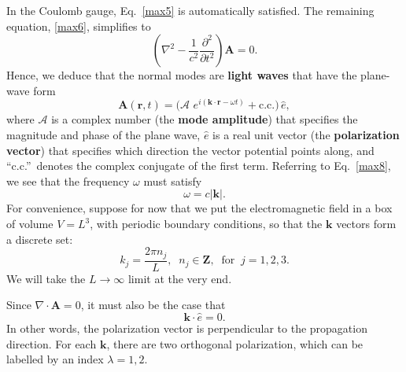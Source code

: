 \documentclass[pra,12pt]{revtex4}
\begin{document}
In the Coulomb gauge, Eq.~\eqref{max5} is automatically satisfied.
The remaining equation, \eqref{max6}, simplifies to
\begin{equation}
  \left(\nabla^2 - \frac{1}{c^2}\frac{\partial^2}{\partial t^2}\right)
  \mathbf{A} = 0. \label{max8}
\end{equation}
Hence, we deduce that the normal modes are \textbf{light waves} that
have the plane-wave form
\begin{equation}
  \mathbf{A}(\mathbf{r},t) = \Big(\mathcal{A}\,
  \, e^{i(\mathbf{k}\cdot\mathbf{r} - \omega t)} + \mathrm{c.c.}\Big)\, \hat{e},
  \label{lightplanewave}
\end{equation}
where $\mathcal{A}$ is a complex number (the \textbf{mode amplitude})
that specifies the magnitude and phase of the plane wave, $\hat{e}$ is
a real unit vector (the \textbf{polarization vector}) that specifies
which direction the vector potential points along, and
``c.c.''~denotes the complex conjugate of the first term.  Referring
to Eq.~\eqref{max8}, we see that the frequency $\omega$ must satisfy
\begin{equation}
  \omega = c|\mathbf{k}|.
\end{equation}
For convenience, suppose for now that we put the electromagnetic field
in a box of volume $V = L^3$, with periodic boundary conditions, so
that the $\mathbf{k}$ vectors form a discrete set:
\begin{equation}
  k_j = \frac{2\pi n_j}{L}, \;\; n_j \in \mathbf{Z}, \;\;\mathrm{for}
  \;\; j = 1,2,3.
\end{equation}
We will take the $L \rightarrow \infty$ limit at the very end.

Since $\nabla \cdot \mathbf{A} = 0$, it must also be the case that
\begin{equation}
  \mathbf{k} \cdot \hat{e} = 0.
\end{equation}
In other words, the polarization vector is perpendicular to the
propagation direction.  For each $\mathbf{k}$, there are two
orthogonal polarization, which can be labelled by an index $\lambda =
1,2$.
\end{document}

